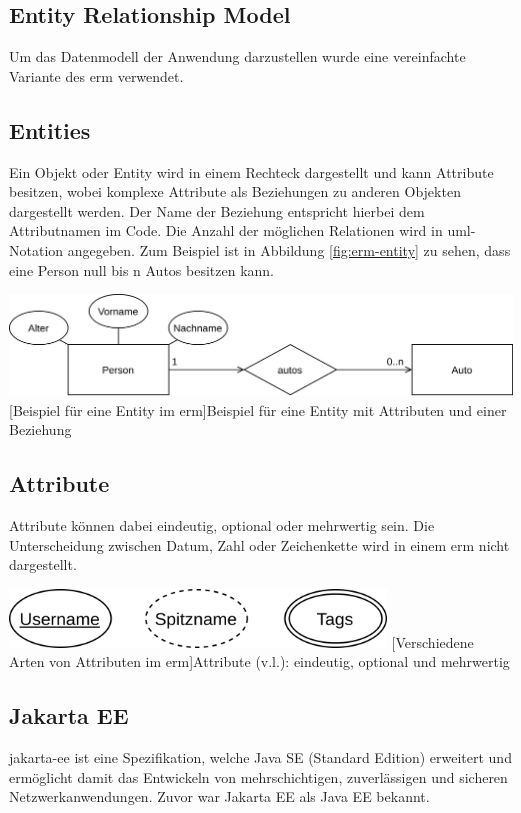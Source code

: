\documentclass[12pt,twoside,a4paper]{article}
\begin{document}
\subsection{Entity Relationship Model}
Um das Datenmodell der Anwendung darzustellen wurde eine vereinfachte Variante des \acrfull{erm} verwendet.\\
\subsection*{Entities}
Ein Objekt oder Entity wird in einem Rechteck dargestellt und kann Attribute besitzen, wobei komplexe Attribute als Beziehungen zu anderen Objekten dargestellt werden. Der Name der Beziehung entspricht hierbei dem Attributnamen im Code. Die Anzahl der möglichen Relationen wird in \acrshort{uml}-Notation angegeben. Zum Beispiel ist in Abbildung \ref{fig:erm-entity} zu sehen, dass eine Person null bis n Autos besitzen kann.
\begin{center}
	\captionsetup{type=figure}
	\includegraphics[width=\textwidth]{images/ERM-Entity}
	[Beispiel für eine Entity im \acrshort{erm}]{Beispiel für eine Entity mit Attributen und einer Beziehung}
	\label{fig:erm-entity}
\end{center}
\subsection*{Attribute}
Attribute können dabei eindeutig, optional oder mehrwertig sein. Die Unterscheidung zwischen Datum, Zahl oder Zeichenkette wird in einem \acrlong{erm} nicht dargestellt.
\begin{center}
	\captionsetup{type=figure}
	\includegraphics[width=10cm]{images/ERM-Attributes}
	[Verschiedene Arten von Attributen im \acrshort{erm}]{Attribute (v.l.): eindeutig, optional und mehrwertig}
	\label{fig:erm-attributes}
\end{center}
\subsection{Jakarta EE}\label{sec:jakarta-ee}
\acrfull{jakarta-ee} ist eine Spezifikation, welche Java SE (Standard Edition) erweitert und ermöglicht damit das Entwickeln von mehrschichtigen, zuverlässigen und sicheren Netzwerkanwendungen. Zuvor war Jakarta EE als Java EE bekannt.\newline\cite{java-ee}
\end{document}

